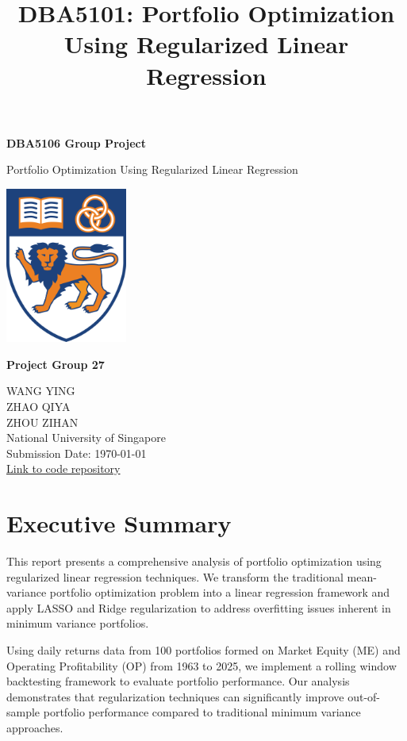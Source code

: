 \documentclass[12pt]{article}
\title{DBA5101: Portfolio Optimization Using Regularized Linear Regression}
\author{}
\date{}
\begin{document}
\begin{titlepage}
    \centering
    \vspace*{1cm}
    {\Huge\bfseries DBA5106 Group Project\\[0.5em]}
    {\Huge Portfolio Optimization Using Regularized Linear Regression \par}
    \vspace{1cm}
    \includegraphics[width=0.30\textwidth]{nus_logo.png} \\[2em]
    {\large \textbf{Project Group 27}\par}
    \vspace{0.5cm}
    {\small
    WANG YING \\[0.2em]
    ZHAO QIYA \\[0.2em]
    ZHOU ZIHAN \\[0.2em]
    }
    \vspace{1cm}
    {\large
    National University of Singapore \\
    \vspace{0.5cm}
    Submission Date: \today \\
    \vspace{0.3cm}
    \href{https://github.com/ying-jeanne/fundation_ba}{Link to code repository}
    }
    \vfill
\end{titlepage}

\newpage

\section{Executive Summary}

This report presents a comprehensive analysis of portfolio optimization using regularized linear regression techniques. We transform the traditional mean-variance portfolio optimization problem into a linear regression framework and apply LASSO and Ridge regularization to address overfitting issues inherent in minimum variance portfolios.

Using daily returns data from 100 portfolios formed on Market Equity (ME) and Operating Profitability (OP) from 1963 to 2025, we implement a rolling window backtesting framework to evaluate portfolio performance. Our analysis demonstrates that regularization techniques can significantly improve out-of-sample portfolio performance compared to traditional minimum variance approaches.
\end{document}
